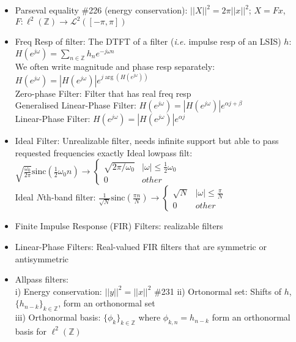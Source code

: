 \documentclass{article}
\newcommand{\ie}{\textit{i.e. }}
\newcommand{\cg}{\color{gray}}
\newcommand{\fs}{\footnotesize}
\begin{document}
\begin{itemize}
\begin{itemize}
\item Parseval equality \#226 (energy conservation): {\color{gray} $||X||^2=2\pi ||x||^2$; $X=Fx$, $F:\ell^2(\mathbb{Z})\rightarrow \mathcal{L}^2([-\pi,\pi])$ }
\item Freq Resp of filter: {\color{gray} The DTFT of a filter (\ie impulse resp of an LSIS) $h$: $H(e^{j\omega})=\sum_{n\in \mathbb{Z}} h_n e^{-j\omega n}$}\\
{\color{gray}\footnotesize
We often write magnitude and phase resp separately: $H(e^{j\omega})=|H(e^{j\omega})|e^{j\arg(H(e^{j\omega}))}$
\\
{Zero-phase Filter: Filter that has real freq resp\\
Generalised Linear-Phase Filter: $H(e^{j\omega})=|H(e^{j\omega})|e^{\alpha j+\beta}$ \\
Linear-Phase Filter: $H(e^{j\omega})=|H(e^{j\omega})|e^{\alpha j}$ }
}
\item Ideal Filter: {\cg Unrealizable filter, needs infinite support but able to pass requested frequencies exactly}
{\cg\fs Ideal lowpass filt: $\sqrt{\frac{\omega_0}{2\pi}}\text{sinc}(\frac{1}{2}\omega_0 n) \rightarrow \begin{cases}\sqrt{2\pi/\omega_0} & |\omega|\le \frac{1}{2}\omega_0 \\ 0 & other\end{cases}$ \\
Ideal $N$th-band filter: $\frac{1}{\sqrt{N}}\text{sinc}(\frac{\pi n}{N}) \rightarrow \begin{cases}\sqrt{N} & |\omega|\le \frac{\pi}{N} \\ 0 & other\end{cases}$
}
\item Finite Impulse Response (FIR) Filters: {\cg realizable filters} \\
\item Linear-Phase Filters: {\cg Real-valued FIR filters that are symmetric or antisymmetric}
\item Allpass filters: \\
{\cg \fs
i) Energy conservation: $||y||^2=||x||^2$ \#231
ii) Ortonormal set: Shifts of $h$, $\{h_{n-k}\}_{k\in\mathbb{Z}}$, form an orthonormal set\\
iii) Orthonormal basis: $\{\phi_k\}_{k\in\mathbb{Z}}$ where $\phi_{k,n}=h_{n-k}$ form an orthonormal basis for $\ell^2(\mathbb{Z})$}


\end{itemize}
\end{itemize}
\end{document}
